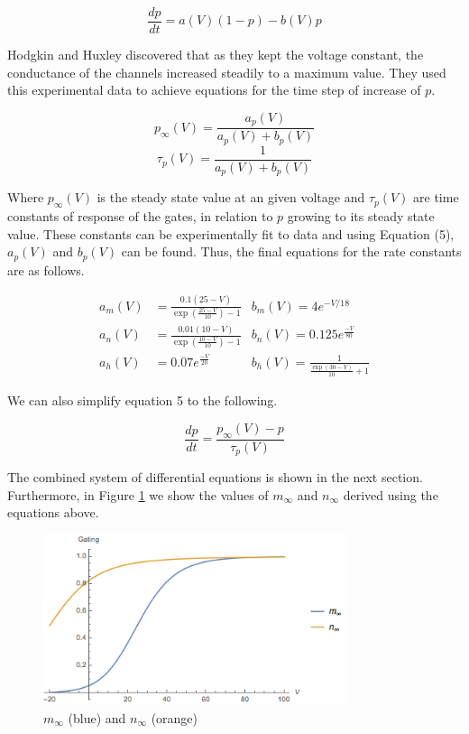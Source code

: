 \documentclass{article}
\begin{document}
\begin{equation}
    \frac{dp}{dt} = a(V)(1-p) - b(V)p
\end{equation}

Hodgkin and Huxley discovered that as they kept the voltage constant, the conductance of the channels increased steadily to a maximum value. They used this experimental data to achieve equations for the time step of increase of $p$.

\begin{equation}
    p_{\infty}(V) = \frac{a_p(V)}{a_p(V) + b_p(V)}
\end{equation}
\begin{equation}
    \tau_p(V) = \frac{1}{a_p(V) + b_p(V)}
    \label{eq:time}
\end{equation}

Where $p_{\infty}(V)$ is the steady state value at an given voltage and ${\tau_p}(V)$ are time constants of response of the gates, in relation to $p$ growing to its steady state value. These constants can be experimentally fit to data and using Equation (5), $a_p(V)$ and $b_p(V)$ can be found. Thus, the final equations for the rate constants are as follows.

\begin{align*}
    a_m(V) &= \frac{0.1(25-V)}{\exp(\frac{25-V}{10})-1}
    &b_m(V) = 4e^{-V/18} \\
    a_n(V) &= \frac{0.01(10-V)}{\exp(\frac{10-V}{10})-1} 
    &b_n(V) = 0.125e^{\frac{-V}{80}}\\
    a_h(V) &= 0.07e^{\frac{-V}{20}} 
    &b_h(V) = \frac{1}{\frac{\exp(30-V)}{10}+1}
\end{align*}

We can also simplify equation 5 to the following.

\begin{equation}
    \frac{dp}{dt} = \frac{p_{\infty}(V)-p}{\tau_p(V)}
\end{equation}

The combined system of differential equations is shown in the next section. Furthermore, in Figure \ref{fig:inf} we show the values of $m_\infty$ and $n_\infty$ derived using the equations above. 

\begin{figure}
\centering
	\includegraphics[height=5cm]{gating.png}
	\caption{$m_{\infty}$ (blue) and $n_{\infty}$ (orange)}
		\label{fig:inf}
\end{figure}
\end{document}
